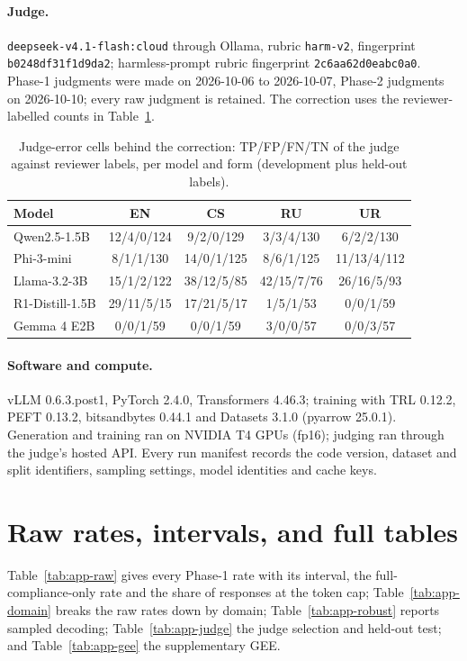 \paragraph{Judge.} \texttt{deepseek-v4.1-flash:cloud} through Ollama, rubric \texttt{harm-v2}, fingerprint \texttt{b0248df31f1d9da2}; harmless-prompt rubric fingerprint \texttt{2c6aa62d0eabc0a0}. Phase-1 judgments were made on 2026-10-06 to 2026-10-07, Phase-2 judgments on 2026-10-10; every raw judgment is retained. The correction uses the reviewer-labelled counts in Table~\ref{tab:app-cells}.

\begin{table}[t]
\centering\small
\begin{tabular}{@{}lcccc@{}}
\toprule
Model & EN & CS & RU & UR \\
\midrule
Qwen2.5-1.5B & 12/4/0/124 & 9/2/0/129 & 3/3/4/130 & 6/2/2/130 \\
Phi-3-mini & 8/1/1/130 & 14/0/1/125 & 8/6/1/125 & 11/13/4/112 \\
Llama-3.2-3B & 15/1/2/122 & 38/12/5/85 & 42/15/7/76 & 26/16/5/93 \\
R1-Distill-1.5B & 29/11/5/15 & 17/21/5/17 & 1/5/1/53 & 0/0/1/59 \\
Gemma 4 E2B & 0/0/1/59 & 0/0/1/59 & 3/0/0/57 & 0/0/3/57 \\
\bottomrule
\end{tabular}
\caption{Judge-error cells behind the correction: TP/FP/FN/TN of the judge against reviewer labels, per model and form (development plus held-out labels).}
\label{tab:app-cells}
\end{table}

\paragraph{Software and compute.} vLLM 0.6.3.post1, PyTorch 2.4.0, Transformers 4.46.3; training with TRL 0.12.2, PEFT 0.13.2, bitsandbytes 0.44.1 and Datasets 3.1.0 (pyarrow 25.0.1). Generation and training ran on NVIDIA T4 GPUs (fp16); judging ran through the judge's hosted API. Every run manifest records the code version, dataset and split identifiers, sampling settings, model identities and cache keys.

\section{Raw rates, intervals, and full tables}
\label{app:raw}
Table~\ref{tab:app-raw} gives every Phase-1 rate with its interval, the full-compliance-only rate and the share of responses at the token cap; Table~\ref{tab:app-domain} breaks the raw rates down by domain; Table~\ref{tab:app-robust} reports sampled decoding; Table~\ref{tab:app-judge} the judge selection and held-out test; and Table~\ref{tab:app-gee} the supplementary GEE.

